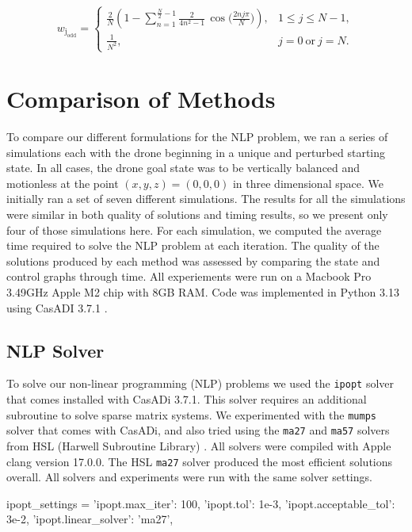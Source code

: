 \documentclass[]{article}
\begin{document}
	\[
        w_{\mathrm{j_{odd}}} =
        \begin{cases}
        \displaystyle
        \frac{2}{N}\!\left(
        1 - \sum_{n=1}^{\frac{N}{2}-1} \frac{2}{4n^{2}-1}\,
        \cos\!\Big(\tfrac{2 n j \pi}{N}\Big)
        \right), & 1 \le j \le N-1, \\[2ex]
        \displaystyle \frac{1}{N^{2}}, & j=0\ \text{or}\ j=N.
        \end{cases}
        \]

\section*{Comparison of Methods}

To compare our different formulations for the NLP problem, we ran a series of simulations each with the drone beginning in a unique and perturbed starting state. In all cases, the drone goal state was to be vertically balanced and motionless at the point $(x,y,z) = (0, 0, 0)$ in three dimensional space. We initially ran a set of seven different simulations. The results for all the simulations were similar in both quality of solutions and timing results, so we present only four of those simulations here.  For each simulation, we computed the average time required to solve the NLP problem at each iteration. The quality of the solutions produced by each method was assessed by comparing the state and control graphs through time. All experiements were run on a Macbook Pro  3.49GHz Apple M2 chip with 8GB RAM. Code was implemented in Python 3.13 using CasADI 3.7.1 \cite{Andersson2018}. 
	
	\subsection*{NLP Solver}
	To solve our non-linear programming (NLP) problems we used the \texttt{ipopt} solver that comes installed with CasADi 3.7.1.  This solver requires an additional subroutine to  solve sparse matrix systems. We experimented with the \texttt{mumps}  solver that comes with CasADi, and also tried using the  \texttt{ma27} and  \texttt{ma57} solvers  from HSL (Harwell Subroutine Library) \cite{hsl}. All solvers were compiled with Apple clang version 17.0.0. The HSL \texttt{ma27} solver produced the most efficient solutions overall. All solvers and experiments were run with the same solver settings.
	\vspace{\baselineskip}
	\begin{python}
        ipopt_settings = {
			'ipopt.max_iter': 100,                  
			'ipopt.tol': 1e-3,                      	
			'ipopt.acceptable_tol': 3e-2,
			'ipopt.linear_solver': 'ma27',
		}
	\end{python}
\end{document}
